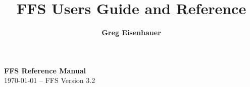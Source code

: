 \documentclass{article}
\title{FFS Users Guide and Reference}
\author{ {\large\bf Greg Eisenhauer }\\
}
\begin{document}

\maketitle
\begin{center}
{\bf\titlefont FFS Reference Manual}\\
\today{} -- FFS Version 3.2
\end{center}
\thispagestyle{empty}

\end{document}
